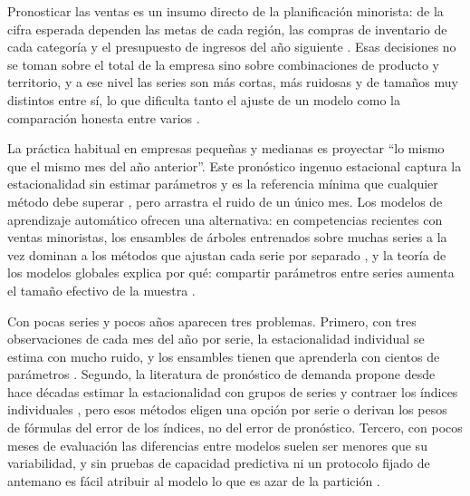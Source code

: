 \documentclass[pdflatex,sn-mathphys-num]{sn-jnl}
\theoremstyle{thmstyleone}
\begin{document}
Pronosticar las ventas es un insumo directo de la planificación minorista: de la cifra esperada dependen las metas de cada región, las compras de inventario de cada categoría y el presupuesto de ingresos del año siguiente \cite{fildes2022}. Esas decisiones no se toman sobre el total de la empresa sino sobre combinaciones de producto y territorio, y a ese nivel las series son más cortas, más ruidosas y de tamaños muy distintos entre sí, lo que dificulta tanto el ajuste de un modelo como la comparación honesta entre varios \cite{fildes2022,hyndman2021}.

La práctica habitual en empresas pequeñas y medianas es proyectar ``lo mismo que el mismo mes del año anterior''. Este pronóstico ingenuo estacional captura la estacionalidad sin estimar parámetros y es la referencia mínima que cualquier método debe superar \cite{hyndman2021}, pero arrastra el ruido de un único mes. Los modelos de aprendizaje automático ofrecen una alternativa: en competencias recientes con ventas minoristas, los ensambles de árboles entrenados sobre muchas series a la vez dominan a los métodos que ajustan cada serie por separado \cite{makridakis2022}, y la teoría de los modelos globales explica por qué: compartir parámetros entre series aumenta el tamaño efectivo de la muestra \cite{monteromanso2021}.

Con pocas series y pocos años aparecen tres problemas. Primero, con tres observaciones de cada mes del año por serie, la estacionalidad individual se estima con mucho ruido, y los ensambles tienen que aprenderla con cientos de parámetros \cite{breiman2001,chen2016}. Segundo, la literatura de pronóstico de demanda propone desde hace décadas estimar la estacionalidad con grupos de series \cite{bunn1993,bunn1999} y contraer los índices individuales \cite{miller2003,chen2007,chen2008,zhang2013}, pero esos métodos eligen una opción por serie o derivan los pesos de fórmulas del error de los índices, no del error de pronóstico. Tercero, con pocos meses de evaluación las diferencias entre modelos suelen ser menores que su variabilidad, y sin pruebas de capacidad predictiva \cite{diebold1995,giacomini2006,hansen2011} ni un protocolo fijado de antemano es fácil atribuir al modelo lo que es azar de la partición \cite{cerqueira2020}.
\end{document}
